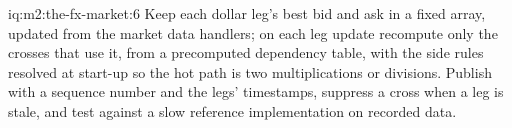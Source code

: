 \begin{solution}{iq:m2:the-fx-market:6}
Keep each dollar leg's best bid and ask in a fixed array, updated from the market
data handlers; on each leg update recompute only the crosses that use it, from
a precomputed dependency table, with the side rules resolved at start-up so the
hot path is two multiplications or divisions. Publish with a sequence number
and the legs' timestamps, suppress a cross when a leg is stale, and test against
a slow reference implementation on recorded data.
\end{solution}
